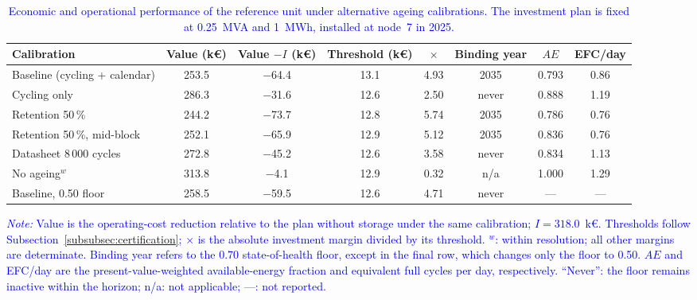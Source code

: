 \documentclass[preprint,12pt]{elsarticle}
\begin{document}
\begin{table}[htbp!]
    \centering
    \caption{\textcolor{blue}{Economic and operational performance of the reference unit under alternative ageing calibrations. The investment plan is fixed at 0.25~MVA and 1~MWh, installed at node~7 in 2025.}}
    \label{tab:res_ageing}
    \scriptsize\setlength{\tabcolsep}{3pt}
    \begin{tabular}{l c c c c c c c}
        \toprule
        Calibration & Value (k\euro) & Value $- I$ (k\euro) & Threshold (k\euro) & $\times$ & Binding year & $AE$ & EFC/day \\
        \midrule
        Baseline (cycling + calendar)   & 253.5 & $-$64.4 & 13.1 & 4.93 & 2035  & 0.793 & 0.86 \\
        Cycling only                    & 286.3 & $-$31.6 & 12.6 & 2.50 & never & 0.888 & 1.19 \\
        Retention 50\,\%                & 244.2 & $-$73.7 & 12.8 & 5.74 & 2035  & 0.786 & 0.76 \\
        Retention 50\,\%, mid-block     & 252.1 & $-$65.9 & 12.9 & 5.12 & 2035  & 0.836 & 0.76 \\
        Datasheet 8\,000 cycles         & 272.8 & $-$45.2 & 12.6 & 3.58 & never & 0.834 & 1.13 \\
        No ageing$^{w}$ & 313.8 & $-$4.1 & 12.9 & 0.32 & n/a & 1.000 & 1.29 \\
        \midrule
        Baseline, 0.50 floor & 258.5 & $-$59.5 & 12.6 & 4.71 & never & --- & --- \\
        \bottomrule
    \end{tabular}
    \par\smallskip
    \begin{minipage}{\linewidth}
        \scriptsize
        \raggedright
        \textcolor{blue}{%
            \textit{Note:} Value is the operating-cost reduction relative to the plan without storage under the same calibration; $I=318.0$~k\euro{}. Thresholds follow Subsection~\ref{subsubsec:certification}; $\times$ is the absolute investment margin divided by its threshold. $^{w}$: within resolution; all other margins are determinate. Binding year refers to the 0.70 state-of-health floor, except in the final row, which changes only the floor to 0.50. $AE$ and EFC/day are the present-value-weighted available-energy fraction and equivalent full cycles per day, respectively. ``Never'': the floor remains inactive within the horizon; n/a: not applicable; ---: not reported.
    }
    \end{minipage}
\end{table}
\end{document}
